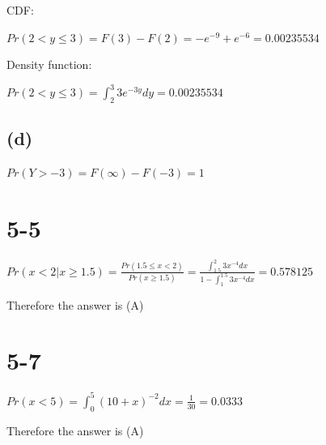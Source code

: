 \documentclass[12pt]{article}
\begin{document}
\begin{spacing}{2.0}
CDF:

$Pr(2 < y \le 3)= F(3)-F(2)= -e^{-9}+e^{-6}= 0.00235534$

Density function:

$Pr(2 < y \le 3)= \int_{2}^{3} 3e^{-3y} dy = 0.00235534$

\subsection*{(d)}

$Pr(Y > -3)= F(\infty)- F(-3)= 1$

\section*{5-5}

$Pr(x<2|x\ge 1.5)= \frac{Pr( 1.5 \le x < 2 )}{Pr(x \ge 1.5)}= \frac{\int_{1.5}^2 3x^{-4} dx}{ 1-\int_{1}^{1.5} 3x^{-4} dx}= 0.578125$

Therefore the answer is (A)

\section*{5-7}

$Pr(x<5)= \int_{0}^{5} (10+x)^{-2} dx = \frac{1}{30}= 0.0333$

Therefore the answer is (A)

\end{spacing}
\end{document}
